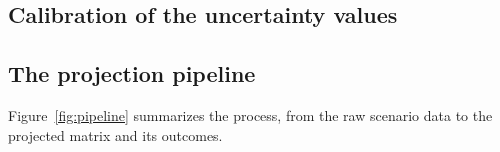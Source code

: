 \documentclass[11pt,a4paper]{article}
\begin{document}
\subsection{Calibration of the uncertainty values}
\label{sub:uncertainty}


\subsection{The projection pipeline}
\label{sub:pipeline}

Figure~\ref{fig:pipeline} summarizes the process, from the raw scenario data to the projected matrix and its outcomes.
\end{document}
